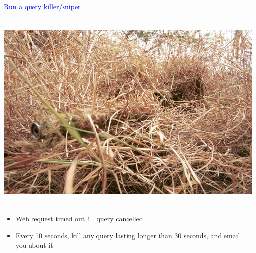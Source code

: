 \documentclass[landscape]{slides}
\begin{document}
\begin{slide}

    \textcolor{blue}{\Large{Run a query killer/sniper}}

    \begin{center}
        \includegraphics[height=10cm]{Camouflaged-sniper}
    \end{center}

    \begin{itemize}
        \item Web request timed out != query cancelled
        \item Every 10 seconds, kill any query lasting longer than 30 seconds, and email you about it
    \end{itemize}

\end{slide}
\end{document}
